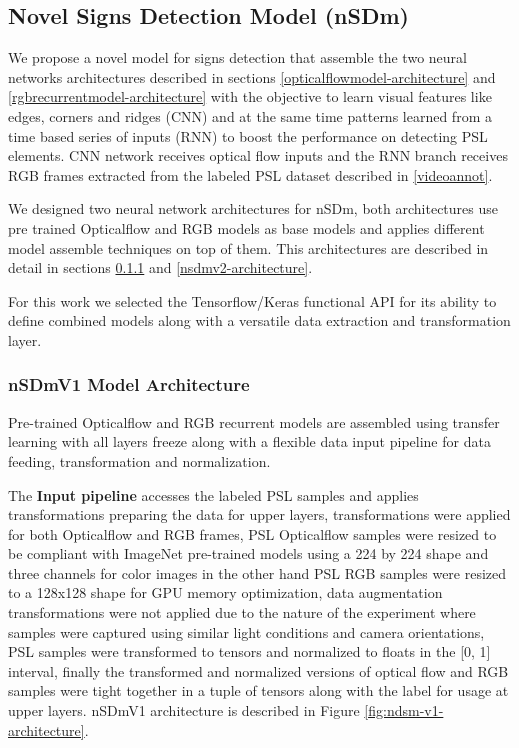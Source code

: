 \documentclass[twocolumn,conference]{article}
\begin{document}
\subsection{Novel Signs Detection Model (nSDm)}\label{nsdm}
We propose a novel model for signs detection that assemble the two neural networks architectures described in sections \ref{opticalflowmodel-architecture} and \ref{rgbrecurrentmodel-architecture} with the objective to learn visual features like edges, corners and ridges (CNN) and at the same time patterns learned from a time based series of inputs (RNN) to boost the performance on detecting PSL elements. CNN network receives optical flow inputs and the RNN branch receives RGB frames extracted from the labeled PSL dataset described in \ref{videoannot}.

We designed two neural network architectures for nSDm, both architectures use pre trained Opticalflow and RGB models as base models and applies different model assemble techniques on top of them. This architectures are described in detail in sections \ref{nsdmv1-architecture} and \ref{nsdmv2-architecture}.

For this work we selected the Tensorflow/Keras functional API for its ability to define combined models along with a versatile data extraction and transformation layer.

\subsubsection{nSDmV1 Model Architecture}\label{nsdmv1-architecture}
Pre-trained Opticalflow and RGB recurrent models are assembled using transfer learning with all layers freeze along with a flexible data input pipeline for data feeding, transformation and normalization.

The \textbf{Input pipeline} accesses the labeled PSL samples and applies transformations preparing the data for upper layers, transformations were applied for both Opticalflow and RGB frames, PSL Opticalflow samples were resized to be compliant with ImageNet pre-trained models using a 224 by 224 shape and three channels for color images in the other hand PSL RGB samples were resized to a 128x128 shape for GPU memory optimization, data augmentation transformations were not applied due to the nature of the experiment where samples were captured using similar light conditions and camera orientations, PSL samples were transformed to tensors and normalized to floats in the [0, 1] interval, finally the transformed and normalized versions of optical flow and RGB samples were tight together in a tuple of tensors along with the label for usage at upper layers. nSDmV1 architecture is described in Figure \ref{fig:ndsm-v1-architecture}.
\end{document}
